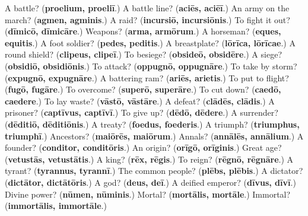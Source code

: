 \begin{tcolorbox}[breakable,colback=teal!4,colframe=teal!35!black,title={Before you move on}]
A battle? (\textbf{proelium, proeliī}.) A battle line? (\textbf{aciēs, aciēī}.) An army on the march? (\textbf{agmen, agminis}.) A raid? (\textbf{incursiō, incursiōnis}.) To fight it out? (\textbf{dīmicō, dīmicāre}.) Weapons? (\textbf{arma, armōrum}.) A horseman? (\textbf{eques, equitis}.) A foot soldier? (\textbf{pedes, peditis}.) A breastplate? (\textbf{lōrīca, lōrīcae}.) A round shield? (\textbf{clipeus, clipeī}.) To besiege? (\textbf{obsideō, obsidēre}.) A siege? (\textbf{obsidiō, obsidiōnis}.) To attack? (\textbf{oppugnō, oppugnāre}.) To take by storm? (\textbf{expugnō, expugnāre}.) A battering ram? (\textbf{ariēs, arietis}.) To put to flight? (\textbf{fugō, fugāre}.) To overcome? (\textbf{superō, superāre}.) To cut down? (\textbf{caedō, caedere}.) To lay waste? (\textbf{vāstō, vāstāre}.) A defeat? (\textbf{clādēs, clādis}.) A prisoner? (\textbf{captīvus, captīvī}.) To give up? (\textbf{dēdō, dēdere}.) A surrender? (\textbf{dēditiō, dēditiōnis}.) A treaty? (\textbf{foedus, foederis}.) A triumph? (\textbf{triumphus, triumphī}.) Ancestors? (\textbf{maiōrēs, maiōrum}.) Annals? (\textbf{annālēs, annālium}.) A founder? (\textbf{conditor, conditōris}.) An origin? (\textbf{orīgō, orīginis}.) Great age? (\textbf{vetustās, vetustātis}.) A king? (\textbf{rēx, rēgis}.) To reign? (\textbf{rēgnō, rēgnāre}.) A tyrant? (\textbf{tyrannus, tyrannī}.) The common people? (\textbf{plēbs, plēbis}.) A dictator? (\textbf{dictātor, dictātōris}.) A god? (\textbf{deus, deī}.) A deified emperor? (\textbf{dīvus, dīvī}.) Divine power? (\textbf{nūmen, nūminis}.) Mortal? (\textbf{mortālis, mortāle}.) Immortal? (\textbf{immortālis, immortāle}.)
\end{tcolorbox}
